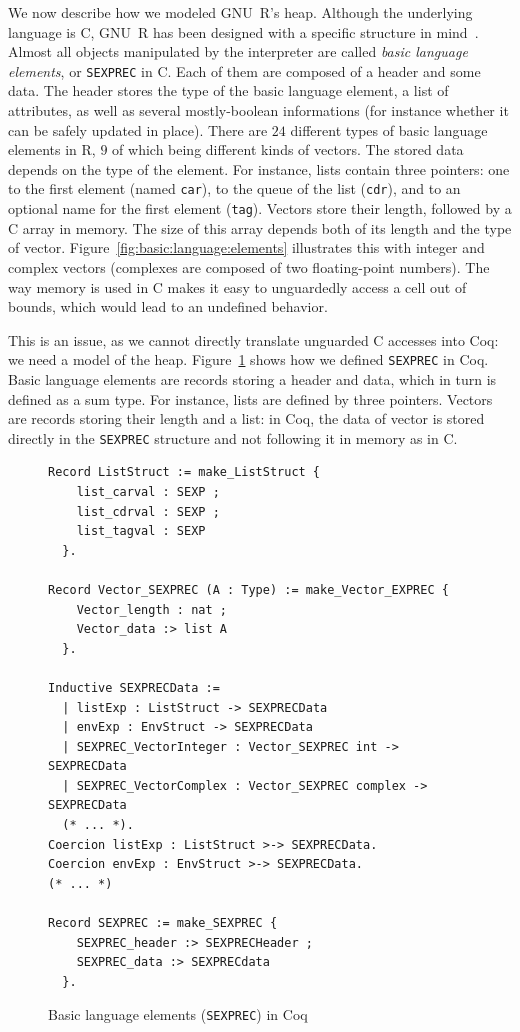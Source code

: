 \documentclass[
    sigplan,
    10pt,
    review, %
    natbib=false %
 ]{acmart}
\begin{document}
We now describe how we modeled GNU~R's heap.
Although the underlying language is C,
GNU~R has been designed with a specific structure in mind~\parencite{R}.
Almost all objects manipulated by the interpreter
are called \emph{basic language elements},
or \texttt{SEXPREC} in C.
Each of them are composed of a header and some data.
%
The header stores the type of the basic language element,
a list of attributes,
as well as several mostly-boolean informations
(for instance whether it can be safely updated in place).
There are \(24\) different types of basic language elements in R,
\(9\) of which being different kinds of vectors.
%
The stored data depends on the type of the element.
For instance, lists contain three pointers:
one to the first element (named \texttt{car}),
to the queue of the list (\texttt{cdr}),
and to an optional name for the first element (\texttt{tag}).
Vectors store their length,
followed by a C array in memory.
The size of this array depends both of its length
and the type of vector.
Figure~\ref{fig:basic:language:elements} illustrates this
with integer and complex vectors
(complexes are composed of two floating-point numbers).
%
The way memory is used in C
makes it easy to unguardedly access a cell out of bounds,
which would lead to an undefined behavior.



This is an issue,
as we cannot directly translate unguarded C accesses into Coq:
we need a model of the heap.
Figure~\ref{fig:SEXPREC} shows how we defined \texttt{SEXPREC} in Coq.
Basic language elements are records storing a header
and data,
which in turn is defined as a sum type.
For instance, lists are defined by three pointers.
Vectors are records storing their length and a list:
in Coq, the data of vector is stored directly in the \texttt{SEXPREC} structure
and not following it in memory as in C.

\begin{figure}
\begin{verbatim}
Record ListStruct := make_ListStruct {
    list_carval : SEXP ;
    list_cdrval : SEXP ;
    list_tagval : SEXP
  }.

Record Vector_SEXPREC (A : Type) := make_Vector_EXPREC {
    Vector_length : nat ;
    Vector_data :> list A
  }.

Inductive SEXPRECData :=
  | listExp : ListStruct -> SEXPRECData
  | envExp : EnvStruct -> SEXPRECData
  | SEXPREC_VectorInteger : Vector_SEXPREC int -> SEXPRECData
  | SEXPREC_VectorComplex : Vector_SEXPREC complex -> SEXPRECData
  (* ... *).
Coercion listExp : ListStruct >-> SEXPRECData.
Coercion envExp : EnvStruct >-> SEXPRECData.
(* ... *)

Record SEXPREC := make_SEXPREC {
    SEXPREC_header :> SEXPRECHeader ;
    SEXPREC_data :> SEXPRECdata
  }.
\end{verbatim}
\vspace{-1em}
    \caption{Basic language elements (\texttt{SEXPREC}) in Coq}
    \label{fig:SEXPREC}
\end{figure}
\end{document}

